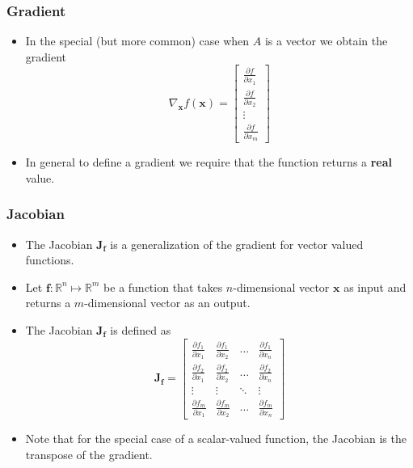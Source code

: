 \documentclass[notes]{beamer}          %
\newcommand{\vect}[1]{\bm{#1}}
\newcommand{\field}[1]{\mathbb{#1}}
\newcommand{\R}{\field{R}}
\begin{document}
\begin{frame}
\frametitle{Gradient}
    \begin{itemize}
        \item In the special (but more common) case when $A$ is a vector we obtain the gradient
        $$ \nabla_{\vect{x}} f(\vect{x}) =
        \begin{bmatrix}
         \frac{\partial f}{\partial x_{1}}  \\
          \frac{\partial f}{\partial x_{2}}  \\
          \vdots  \\
           \frac{\partial f}{\partial x_{m}}
        \end{bmatrix}$$
        \item In general to define a gradient we require that the function returns a {\bf real} value.
    \end{itemize}

\end{frame}

\begin{frame}
\frametitle{Jacobian}

\begin{itemize}
    \item The Jacobian $\vect{J_f}$ is a generalization of the gradient for vector valued functions.
    \item Let $\vect{f}:\R^n \mapsto \R^m $ be a function that takes $n$-dimensional vector $\vect{x}$ as input and returns a $m$-dimensional vector as an output.
    \item The Jacobian $\vect{J_f}$ is defined as
    $$
        \vect{J_f} =
        \begin{bmatrix}
         \frac{\partial f_1}{\partial x_{1}} & \frac{\partial f_1}{\partial x_{2}} & \ldots & \frac{\partial f_1}{\partial x_{n}} \\
          \frac{\partial f_2}{\partial x_{1}} & \frac{\partial f_2}{\partial x_{2}} & \ldots & \frac{\partial f_2}{\partial x_{n}} \\
          \vdots & \vdots & \ddots & \vdots \\
           \frac{\partial f_m}{\partial x_{1}} & \frac{\partial f_m}{\partial x_{2}} & \ldots & \frac{\partial f_m}{\partial x_{n}}
        \end{bmatrix}
    $$
    \item Note that for the special case of a scalar-valued function, the Jacobian is the transpose of the gradient.
\end{itemize}

\end{frame}
\end{document}
